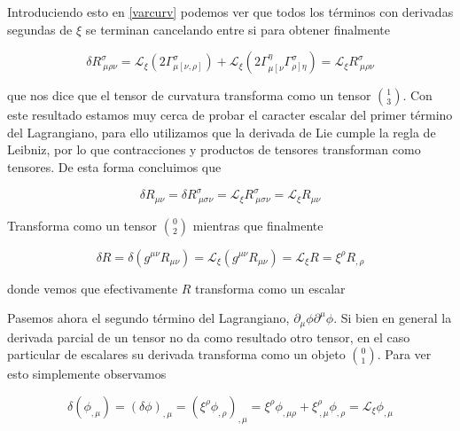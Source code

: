 \documentclass{article}
\numberwithin{equation}{section}
\begin{document}
Introduciendo esto en \ref{varcurv} podemos ver que todos los términos con derivadas segundas de $ \xi $ se terminan cancelando entre si para obtener finalmente

\begin{equation*}
\delta R^{\sigma}_{ \ \mu \rho \nu} = \mathcal{L}_{\xi} \left( 2 \Gamma^{\sigma}_{\mu \left[\nu , \rho\right] } \right) + \mathcal{L}_{\xi} \left(2\Gamma^{\eta}_{\mu\left[ \nu \right.}\Gamma^{\sigma}_{ \left. \rho \right] \eta}\right) = \mathcal{L}_{\xi} R^{\sigma}_{ \ \mu \rho \nu}
\end{equation*}

que nos dice que el tensor de curvatura transforma como un tensor $ \binom{1}{3} $. Con este resultado estamos muy cerca de probar el caracter escalar del primer término del Lagrangiano, para ello utilizamos que la derivada de Lie cumple la regla de Leibniz, por lo que contracciones y productos de tensores transforman como tensores. De esta forma concluimos que

\begin{equation*}
\delta R_{\mu \nu} = \delta R^{\sigma}_{ \ \mu \sigma \nu} = \mathcal{L}_{\xi} R^{\sigma}_{ \ \mu \sigma \nu} = \mathcal{L}_{\xi} R_{\mu \nu} 
\end{equation*} 

Transforma como un tensor $ \binom{0}{2} $ mientras que finalmente

\vspace{0.4cm}

\begin{boxquation}
\begin{equation}\label{res3}
\delta R = \delta \left( g^{\mu \nu }R_{\mu \nu }\right) = \mathcal{L}_{\xi} \left( g^{\mu \nu }R_{\mu \nu }\right) = \mathcal{L}_{\xi} R = \xi^{\rho}R_{,\rho} 
\end{equation}
\end{boxquation}

donde vemos que efectivamente $ R $ transforma como un escalar\\

\vspace{0.4cm}

Pasemos ahora el segundo término del Lagrangiano, $ \partial_{\mu}\phi\partial^{\mu}\phi $. Si bien en general la derivada parcial de un tensor no da como resultado otro tensor, en el caso particular de escalares su derivada transforma como un objeto $ \binom{0}{1} $. Para ver esto simplemente observamos 

\begin{equation*}
\delta \left( \phi_{,\mu} \right) = \left(\delta \phi\right)_{,\mu} = \left(\xi^{\rho} \phi_{,\rho}\right)_{,\mu} = \xi^{\rho}\phi_{,\mu\rho} + \xi^{\rho}_{ \ ,\mu} \phi_{,\rho} = \mathcal{L}_{\xi} \phi_{,\mu}
\end{equation*}
\end{document}
